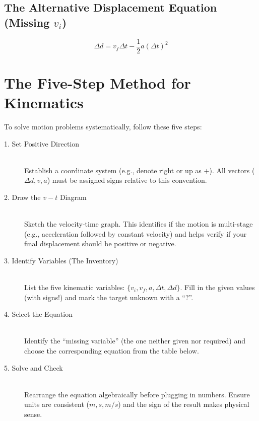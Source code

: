 \documentclass{article}
\begin{document}
\subsection{The Alternative Displacement Equation (Missing \texorpdfstring{$v_i$}{v\_i})}
\begin{equation}
  \Delta d = v_f \Delta t - \frac{1}{2}a(\Delta t)^2
  \label{eq:ua:disp_2}
\end{equation}

\newpage

\section{The Five-Step Method for Kinematics}

To solve motion problems systematically, follow these five steps:

\begin{description}
  \item[1. Set Positive Direction] \hfill \\
    Establish a coordinate system (e.g., denote right or up as $+$). All vectors ($\Delta d, v, a$) must be assigned signs relative to this convention.
  \item[2. Draw the $v-t$ Diagram] \hfill \\
    Sketch the velocity-time graph. This identifies if the motion is multi-stage (e.g., acceleration followed by constant velocity) and helps verify if your final displacement should be positive or negative.
  \item[3. Identify Variables (The Inventory)] \hfill \\
    List the five kinematic variables: $\{v_i, v_f, a, \Delta t, \Delta d\}$. Fill in the given values (with signs!) and mark the target unknown with a ``?''.
  \item[4. Select the Equation] \hfill \\
    Identify the ``missing variable'' (the one neither given nor required) and choose the corresponding equation from the table below.
  \item[5. Solve and Check] \hfill \\
    Rearrange the equation algebraically before plugging in numbers. Ensure units are consistent ($m, s, m/s$) and the sign of the result makes physical sense.
\end{description}
\end{document}
